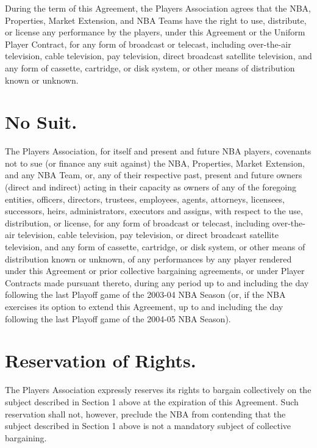 \documentclass[
]{book}
\begin{document}
During the term of this Agreement, the Players Association agrees that the NBA, Properties, Market Extension, and NBA Teams have the right to use, distribute, or license any performance by the players, under this Agreement or the Uniform Player Contract, for any form of broadcast or telecast, including over-the-air television, cable television, pay television, direct broadcast satellite television, and any form of cassette, cartridge, or disk system, or other means of distribution known or unknown.

\hypertarget{no-suit.}{%
\section{No Suit.}\label{no-suit.}}

The Players Association, for itself and present and future NBA players, covenants not to sue (or finance any suit against) the NBA, Properties, Market Extension, and any NBA Team, or, any of their respective past, present and future owners (direct and indirect) acting in their capacity as owners of any of the foregoing entities, officers, directors, trustees, employees, agents, attorneys, licensees, successors, heirs, administrators, executors and assigns, with respect to the use, distribution, or license, for any form of broadcast or telecast, including over-the-air television, cable television, pay television, or direct broadcast satellite television, and any form of cassette, cartridge, or disk system, or other means of distribution known or unknown, of any performances by any player rendered under this Agreement or prior collective bargaining agreements, or under Player Contracts made pursuant thereto, during any period up to and including the day following the last Playoff game of the 2003-04 NBA Season (or, if the NBA exercises its option to extend this Agreement, up to and including the day following the last Playoff game of the 2004-05 NBA Season).

\hypertarget{reservation-of-rights.}{%
\section{Reservation of Rights.}\label{reservation-of-rights.}}

The Players Association expressly reserves its rights to bargain collectively on the subject described in Section 1 above at the expiration of this Agreement. Such reservation shall not, however, preclude the NBA from contending that the subject described in Section 1 above is not a mandatory subject of collective bargaining.
\end{document}

